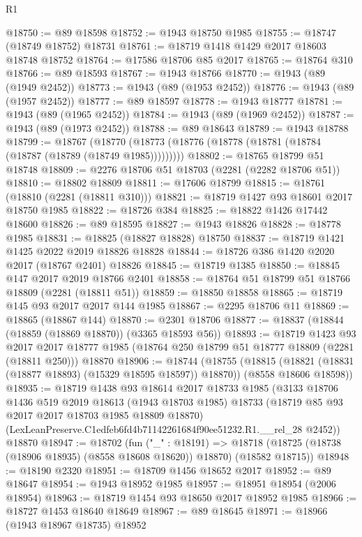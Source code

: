 \begin{lexlean}{R1}
\begin{coremodule}
@18750 := @89 @18598
@18752 := @1943 @18750 @1985
@18755 := @18747 (@18749 @18752) @18731
@18761 := @18719 @1418 @1429 @2017 @18603 @18748 @18752
@18764 := @17586 @18706 @85 @2017
@18765 := @18764 @310
@18766 := @89 @18593
@18767 := @1943 @18766
@18770 := @1943 (@89 (@1949 @2452))
@18773 := @1943 (@89 (@1953 @2452))
@18776 := @1943 (@89 (@1957 @2452))
@18777 := @89 @18597
@18778 := @1943 @18777
@18781 := @1943 (@89 (@1965 @2452))
@18784 := @1943 (@89 (@1969 @2452))
@18787 := @1943 (@89 (@1973 @2452))
@18788 := @89 @18643
@18789 := @1943 @18788
@18799 := @18767
    (@18770 (@18773 (@18776 (@18778 (@18781 (@18784 (@18787 (@18789 (@18749 @1985)))))))))
@18802 := @18765 @18799 @51 @18748
@18809 := @2276 @18706 @51 @18703 (@2281 (@2282 @18706 @51))
@18810 := @18802 @18809
@18811 := @17606 @18799
@18815 := @18761 (@18810 (@2281 (@18811 @310)))
@18821 := @18719 @1427 @93 @18601 @2017 @18750 @1985
@18822 := @18726 @384
@18825 := @18822 @1426 @17442 @18600
@18826 := @89 @18595
@18827 := @1943 @18826
@18828 := @18778 @1985
@18831 := @18825 (@18827 @18828) @18750
@18837 := @18719 @1421 @1425 @2022 @2019 @18826 @18828
@18844 := @18726 @386 @1420 @2020 @2017 (@18767 @2401) @18826
@18845 := @18719 @1385
@18850 := @18845 @147 @2017 @2019 @18766 @2401
@18858 := @18764 @51 @18799 @51 @18766 @18809 (@2281 (@18811 @51))
@18859 := @18850 @18858
@18865 := @18719 @145 @93 @2017 @2017 @144 @1985
@18867 := @2295 @18706 @11
@18869 := @18865 (@18867 @144)
@18870 := @2301 @18706
@18877 := @18837 (@18844 (@18859 (@18869 @18870)) (@3365 @18593 @56))
@18893 := @18719
    @1423
    @93
    @2017
    @2017
    @18777
    @1985
    (@18764 @250 @18799 @51 @18777 @18809 (@2281 (@18811 @250)))
    @18870
@18906 := @18744
    (@18755
      (@18815 (@18821 (@18831 (@18877 @18893) (@15329 @18595 @18597)) @18870))
      (@8558 @18606 @18598))
@18935 := @18719
    @1438
    @93
    @18614
    @2017
    @18733
    @1985
    (@3133
      @18706
      @1436
      @519
      @2019
      @18613
      (@1943 @18703 @1985)
      @18733
      (@18719 @85 @93 @2017 @2017 @18703 @1985 @18809 @18870)
      (LexLeanPreserve.C1edfeb6fd4b71142261684f90ee51232.R1.__rel_28 @2452))
    @18870
@18947 := @18702
    (fun ("_" : @18191) =>
    @18718 (@18725 (@18738 (@18906 @18935) (@8558 @18608 @18620)) @18870) (@18582 @18715))
@18948 := @18190 @2320
@18951 := @18709 @1456 @18652 @2017
@18952 := @89 @18647
@18954 := @1943 @18952 @1985
@18957 := @18951 @18954 (@2006 @18954)
@18963 := @18719 @1454 @93 @18650 @2017 @18952 @1985
@18966 := @18727 @1453 @18640 @18649
@18967 := @89 @18645
@18971 := @18966 (@1943 @18967 @18735) @18952

\end{coremodule}
\end{lexlean}
